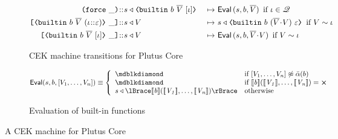 \begin{figure}[H]
\begin{subfigure}[c]{\linewidth}
\begin{minipage}{\linewidth}
\begin{alignat*}{2}
\inForceFrame{} \cons s & \return \VBuiltin{b}{\repetition{V}}{[\iota]}   &~\mapsto~&
                         \mathsf{Eval}\,(s, b, \repetition{V}) \enskip \mbox{if $\iota \in \QVar$}\\
\inAppRightFrame{\VBuiltin{b}{\repetition{V}}{(\iota \cons \varepsilon)}} \cons s & \return V &~\mapsto~&
                         s \return \VBuiltin{b}{(\repetition{V} \snoc V)}{\varepsilon} \enskip \mbox{if $V \sim \iota$}\\
\inAppRightFrame{\VBuiltin{b}{\repetition{V}}{[\iota]}} \cons s  & \return V &~\mapsto~&
                         \mathsf{Eval}\,(s, b, \repetition{V}\snoc V) \enskip \mbox{if $V \sim \iota$}\\
\end{alignat*}
\end{minipage}
    \caption{CEK machine transitions for Plutus Core}
    \label{fig:untyped-cek-transitions}
\end{subfigure}

\bigskip
  \begin{subfigure}[c]{\linewidth}
$$ \mathsf{Eval}(s, b, [V_1, \ldots, V_n]) \equiv \left\{
   \begin{array}{ll}
      \cekerror  & \mbox{if $[V_1, \ldots, V_n] \not\approx \bar{\alpha}(b)$}\\  
      \cekerror  & \mbox{if $\denote{b}(\denote{V_1}, \ldots, \denote{V_n})= \errorX$}\\  
      s \return \reify{\denote{b}(\denote{V_1}, \ldots, \denote{V_n})} & \mbox{otherwise}
   \end{array}
   \right. \\
$$
    \caption{Evaluation of built-in functions}
    \label{fig:untyped-cek-builtins}
    \end{subfigure}

  \caption{A CEK machine for Plutus Core}
\label{fig:untyped-cek-machine}
\end{figure}

